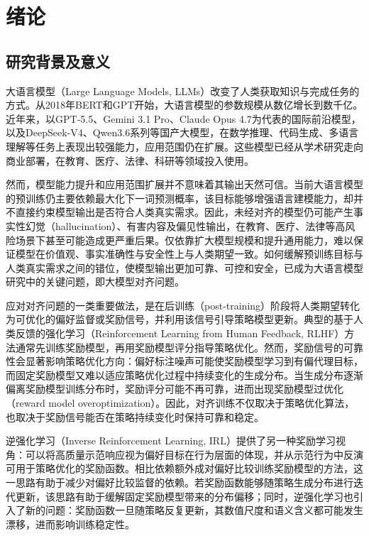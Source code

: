 
\chapter{绪论}

\section{研究背景及意义}

大语言模型（Large Language Models, LLMs）改变了人类获取知识与完成任务的方式。从2018年BERT\cite{devlin2018bert}和GPT\cite{radford2018improving}开始，大语言模型的参数规模从数亿增长到数千亿。近年来，以GPT-5.5\cite{openai2026gpt55}、Gemini 3.1 Pro\cite{geminiteam2026gemini31}、Claude Opus 4.7\cite{anthropic2026claudeopus47}为代表的国际前沿模型，以及DeepSeek-V4\cite{deepseekai2026deepseekv4}、Qwen3.6系列\cite{qwenteam2026qwen36}等国产大模型，在数学推理、代码生成、多语言理解等任务上表现出较强能力，应用范围仍在扩展。这些模型已经从学术研究走向商业部署，在教育、医疗、法律、科研等领域投入使用。

然而，模型能力提升和应用范围扩展并不意味着其输出天然可信。当前大语言模型的预训练仍主要依赖最大化下一词预测概率，该目标能够增强语言建模能力，却并不直接约束模型输出是否符合人类真实需求。因此，未经对齐的模型仍可能产生事实性幻觉（hallucination）\cite{ji2023survey}、有害内容及偏见性输出，在教育、医疗、法律等高风险场景下甚至可能造成更严重后果。仅依靠扩大模型规模和提升通用能力，难以保证模型在价值观、事实准确性与安全性上与人类期望一致。如何缓解预训练目标与人类真实需求之间的错位，使模型输出更加可靠、可控和安全，已成为大语言模型研究中的关键问题，即大模型对齐问题\cite{gabriel2020artificial}。

应对对齐问题的一类重要做法，是在后训练（post-training）阶段将人类期望转化为可优化的偏好监督或奖励信号，并利用该信号引导策略模型更新。典型的基于人类反馈的强化学习（Reinforcement Learning from Human Feedback, RLHF）方法通常先训练奖励模型，再用奖励模型评分指导策略优化。然而，奖励信号的可靠性会显著影响策略优化方向：偏好标注噪声可能使奖励模型学习到有偏代理目标，而固定奖励模型又难以适应策略优化过程中持续变化的生成分布。当生成分布逐渐偏离奖励模型训练分布时，奖励评分可能不再可靠，进而出现奖励模型过优化（reward model overoptimization）\cite{gao2023scaling}。因此，对齐训练不仅取决于策略优化算法，也取决于奖励信号能否在策略持续变化时保持可靠和稳定。

逆强化学习（Inverse Reinforcement Learning, IRL）\cite{ng2000algorithms}提供了另一种奖励学习视角：可以将高质量示范响应视为偏好目标在行为层面的体现，并从示范行为中反演可用于策略优化的奖励函数。相比依赖额外成对偏好比较训练奖励模型的方法，这一思路有助于减少对偏好比较监督的依赖。若奖励函数能够随策略生成分布进行迭代更新，该思路有助于缓解固定奖励模型带来的分布偏移；同时，逆强化学习也引入了新的问题：奖励函数一旦随策略反复更新，其数值尺度和语义含义都可能发生漂移，进而影响训练稳定性。

